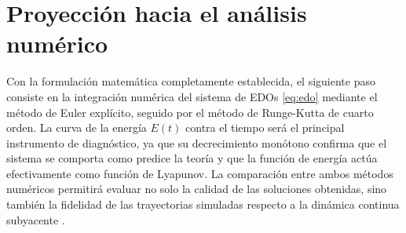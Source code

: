 \documentclass[12pt,a4paper]{article}
\begin{document}
\section{Proyección hacia el análisis numérico}

Con la formulación matemática completamente establecida, el siguiente paso consiste en la integración numérica del sistema de EDOs \eqref{eq:edo} mediante el método de Euler explícito, seguido por el método de Runge-Kutta de cuarto orden. La curva de la energía $E(t)$ contra el tiempo será el principal instrumento de diagnóstico, ya que su decrecimiento monótono confirma que el sistema se comporta como predice la teoría y que la función de energía actúa efectivamente como función de Lyapunov. La comparación entre ambos métodos numéricos permitirá evaluar no solo la calidad de las soluciones obtenidas, sino también la fidelidad de las trayectorias simuladas respecto a la dinámica continua subyacente \parencite{Goemaere2024}.

\nocite{*}
\printbibliography[title={Referencias}]
\end{document}
